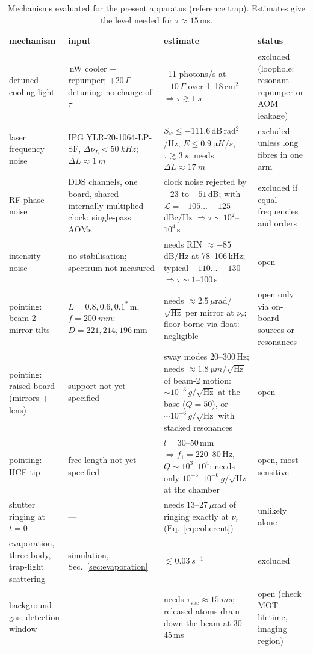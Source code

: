 \documentclass[11pt,a4paper]{article}
\begin{document}
\begin{table}[p]
\centering
\caption{Mechanisms evaluated for the present apparatus (reference trap). Estimates give the level needed for $\tau\approx15$\,ms.}
\label{tab:case}
\small
\begin{tabular}{@{}>{\raggedright\arraybackslash}p{3.1cm}>{\raggedright\arraybackslash}p{4.6cm}>{\raggedright\arraybackslash}p{4.6cm}>{\raggedright\arraybackslash}p{2.6cm}@{}}
\toprule
mechanism & input & estimate & status \\
\midrule
detuned cooling light & 400\,nW cooler + repumper; $+20\,\Gamma$ detuning: no change of $\tau$ & 0.6--11 photons/s at $-10\,\Gamma$ over 1--18\,cm$^2$ $\Rightarrow\tau\gtrsim\SI{1}{s}$ & excluded (loophole: resonant repumper or AOM leakage) \\
laser frequency noise & IPG YLR-20-1064-LP-SF, $\Delta\nu_L<\SI{50}{kHz}$; $\Delta L\approx\SI{1}{m}$ & $S_\varphi\le-111.6$\,dB\,rad$^2$/Hz, $\dot E\le\SI{0.9}{\micro K/s}$, $\tau\gtrsim\SI{3}{s}$; needs $\Delta L\approx\SI{17}{m}$ & excluded unless long fibres in one arm \\
RF phase noise & 2 DDS channels, one board, shared internally multiplied clock; single-pass AOMs & clock noise rejected by $-23$ to $-51$\,dB; with $\mathcal L=-105\ldots-125$\,dBc/Hz $\Rightarrow\tau\sim10^2$--$10^4$\,s & excluded if equal frequencies and orders \\
intensity noise & no stabilisation; spectrum not measured & needs RIN $\approx-85$\,dB/Hz at 78--106\,kHz; typical $-110\ldots-130$ $\Rightarrow\tau\sim1$--100\,s & open \\
pointing: beam-2 mirror tilts & $L=0.8,0.6,0.1^*$\,m, $f=\SI{200}{mm}$: $D=221,214,196$\,mm & needs $\approx2.5\,\mu$rad/$\sqrt{\mathrm{Hz}}$ per mirror at $\nu_r$; floor-borne via float: negligible & open only via on-board sources or resonances \\
pointing: raised board (mirrors + lens) & support not yet specified & sway modes 20--300\,Hz; needs $\approx\SI{1.8}{\micro m}/\sqrt{\mathrm{Hz}}$ of beam-2 motion: $\sim10^{-3}\,g/\sqrt{\mathrm{Hz}}$ at the base ($Q=50$), or $\sim10^{-6}\,g/\sqrt{\mathrm{Hz}}$ with stacked resonances & open \\
pointing: HCF tip & free length not yet specified & $l=30$--50\,mm $\Rightarrow f_1=220$--80\,Hz, $Q\sim10^3$--$10^4$: needs only $10^{-5}$--$10^{-6}\,g/\sqrt{\mathrm{Hz}}$ at the chamber & open, most sensitive \\
shutter ringing at $t=0$ & --- & needs 13--27\,$\mu$rad of ringing exactly at $\nu_r$ (Eq.~\eqref{eq:coherent}) & unlikely alone \\
evaporation, three-body, trap-light scattering & simulation, Sec.~\ref{sec:evaporation} & $\lesssim\SI{0.03}{s^{-1}}$ & excluded \\
background gas; detection window & --- & needs $\tau_\mathrm{vac}\approx\SI{15}{ms}$; released atoms drain down the beam at 30--45\,ms & open (check MOT lifetime, imaging region) \\
\bottomrule
\end{tabular}


\end{table}
\end{document}
